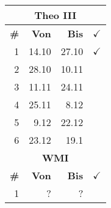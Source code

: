 \documentclass{article}
\begin{document}
\begin{table}
\begin{tabular}{r|r|r|l}
        \multicolumn{4}{c}{\textbf{Theo III}}\\
        \hline
        \hline
        \textbf{\#}&
        \textbf{Von}&
        \textbf{Bis}&
        $\checkmark$\\
        \hline
        \hline
        \color{teal}
        1&14.10&27.10&$\checkmark$\\
        \color{teal}
        2&28.10&10.11\\
        3&11.11&24.11\\
        4&25.11&8.12\\
        5&9.12&22.12\\
        6&23.12&19.1\\
        \hline
        \hline

        \multicolumn{4}{c}{\textbf{WMI}}\\
        \hline
        \hline
        \textbf{\#}&
        \textbf{Von}&
        \textbf{Bis}&
        $\checkmark$\\
        \hline
        \hline
        1&?&?
    \end{tabular}
\end{table}
\end{document}
